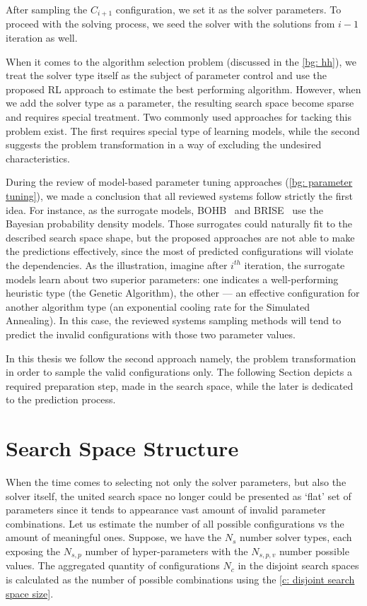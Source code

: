 After sampling the $C_{i+1}$ configuration, we set it as the solver parameters. To proceed with the solving process, we seed the solver with the solutions from $i-1$ iteration as well.

When it comes to the algorithm selection problem (discussed in the \cref{bg: hh}), we treat the solver type itself as the subject of parameter control and use the proposed RL approach to estimate the best performing algorithm. However, when we add the solver type as a parameter, the resulting search space become sparse and requires special treatment. Two commonly used approaches for tacking this problem exist. The first requires special type of learning models, while the second suggests the problem transformation in a way of excluding the undesired characteristics.

During the review of model-based parameter tuning approaches (\cref{bg: parameter tuning}), we made a conclusion that all reviewed systems follow strictly the first idea. For instance, as the surrogate models, BOHB~\cite{falkner2018bohb} and BRISE~\cite{brise2spl} use the Bayesian probability density models. Those surrogates could naturally fit to the described search space shape, but the proposed approaches are not able to make the predictions effectively, since the most of predicted configurations will violate the dependencies. As the illustration, imagine after $i^{th}$ iteration, the surrogate models learn about two superior parameters: one indicates a well-performing heuristic type (the Genetic Algorithm), the other — an effective configuration for another algorithm type (an exponential cooling rate for the Simulated Annealing). In this case, the reviewed systems sampling methods will tend to predict the invalid configurations with those two parameter values.

In this thesis we follow the second approach namely, the problem transformation in order to sample the valid configurations only. The following Section depicts a required preparation step, made in the search space, while the later is dedicated to the prediction process.


\section{Search Space Structure}\label{concept:search space}
When the time comes to selecting not only the solver parameters, but also the solver itself, the united search space no longer could be presented as `flat' set of parameters since it tends to appearance vast amount of invalid parameter combinations. Let us estimate the number of all possible configurations vs the amount of meaningful ones. Suppose, we have the $N_s$ number solver types, each exposing the $N_{s,p}$ number of hyper-parameters with the $N_{s,p,v}$ number possible values. The aggregated quantity of configurations $N_c$ in the disjoint search spaces is calculated as the number of possible combinations using the \cref{c: disjoint search space size}.

